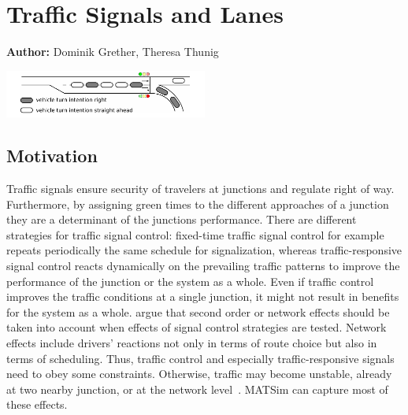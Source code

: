 \chapter{Traffic Signals and Lanes}
\label{ch:signalslanes}

\hfill \textbf{Author:} Dominik Grether, Theresa Thunig

\begin{center} \includegraphics[width=0.5\textwidth, angle=0]{extending/figures/signalslanes/single_queue_model_inkscape.pdf} \end{center}



\section{Motivation}

Traffic signals ensure security of travelers at junctions and regulate right of way. 
Furthermore, by assigning green times to the different approaches of a junction they are a determinant of the junctions performance. 
There are different strategies for traffic signal control: fixed-time traffic signal control for example repeats periodically the same schedule for signalization, whereas traffic-responsive signal control reacts dynamically on the prevailing traffic patterns to improve the performance of the junction or the system as a whole.   
Even if traffic %
control improves the traffic conditions at a single junction, it might not result in benefits for the system as a whole. 
\citet{Hu1997D2DFlowEvolutionReactiveSignalsDynasmart} argue that
second order or network effects should be taken into account when effects of signal control strategies are tested. Network effects include drivers' reactions not only in terms of route choice but also in terms of scheduling. 
Thus, traffic control and especially traffic-responsive signals need to obey some constraints. Otherwise, traffic may become unstable, already at two nearby junction, or at the network level~\citep{LaemmerHelbing2010SelfStabilizingSignalControlRealNet}. 
MATSim can capture most of these effects. 

